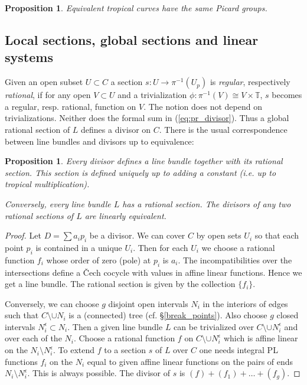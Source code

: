 \documentclass[12pt]{amsart}
\theoremstyle{plain}
\newtheorem{proposition}[theorem]{Proposition}
\theoremstyle{definition}
\theoremstyle{remark}
\newcommand{\<}{\langle}   %
\renewcommand{\>}{\rangle} %
\newcommand{\Rtr}{\mathbb T}
\begin{document}
\begin{proposition}
Equivalent tropical curves have the same Picard groups.
\end{proposition}



\subsection{Local sections, global sections and linear systems}
Given an open subset $U\subset C$ a section $s:U\to\pi^{-1} (U_p)$ is {\em
regular}, respectively {\em rational},
if for any open $V\subset U$ and
a trivialization $\phi: \pi^{-1} (V)\cong V\times \Rtr$, $s$ becomes a
regular, resp. rational, function on $V$. The notion does not depend on
trivializations. Neither does the formal sum in (\ref{eq:pr_divisor}). Thus a
global rational section of $L$ defines a divisor on $C$. There is the usual
correspondence between line bundles and divisors up to equivalence:

\begin{proposition}\label{prop:divisors-bundles}
Every divisor defines a line bundle together with its
rational section. This section is defined uniquely up
to adding a constant (i.e. up to tropical multiplication).

Conversely, every line bundle $L$ has a
rational section. The divisors of any two rational sections of $L$ are
linearly equivalent.
\end{proposition}
\begin{proof}
Let $D=\sum a_i p_i$ be a divisor. We can cover $C$ by open sets $U_i$ so that
each point $p_i$ is contained in a unique $U_i$. Then for each $U_i$ we choose
a rational function $f_i$ whose order of zero (pole) at $p_i$ is $a_i$. The
incompatibilities over the intersections define a \v{C}ech cocycle with values
in affine linear functions. Hence we get a line bundle. The rational section
is given by the collection $\{f_i\}$.

Conversely, we can choose $g$ disjoint open intervals
$N_i$ in the interiors of edges such that $C\setminus {\cup N_i}$ is a (connected) tree (cf. \S \ref{break_points}). Also choose $g$ closed intervals $N^\epsilon_i\subset N_i$.
Then a given line bundle $L$ can be
trivialized over $C\setminus{\cup N^\epsilon_i}$ and over each of the $N_i$. Choose a
rational function $f$ on $C\setminus{\cup N^\epsilon_i}$ which is affine linear on the $N_i \setminus N^\epsilon_i$. To extend $f$ to a section $s$ of $L$ over $C$ one needs integral PL functions $f_i$ on the $N_i$ equal to given affine linear functions on the pairs of ends $N_i \setminus N^\epsilon_i$. This is always possible. The divisor of $s$ is $(f)+(f_1)+\dots+(f_g)$.
\end{proof}
\end{document}
